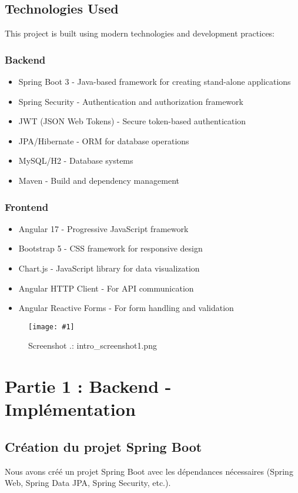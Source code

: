 \documentclass[12pt,a4paper]{report}
\newcounter{screenshotcounter}[chapter]
\newcommand{\screenshot}[2]{
  \stepcounter{screenshotcounter}
  \begin{figure}[H]
    \centering
    \texttt{[image: \#1]}
    \caption{Screenshot \thechapter.\thescreenshotcounter: #1}
    \label{fig:#1}
  \end{figure}
}
\begin{document}
\section{Technologies Used}
This project is built using modern technologies and development practices:

\subsection{Backend}
\begin{itemize}
    \item Spring Boot 3 - Java-based framework for creating stand-alone applications
    \item Spring Security - Authentication and authorization framework
    \item JWT (JSON Web Tokens) - Secure token-based authentication
    \item JPA/Hibernate - ORM for database operations
    \item MySQL/H2 - Database systems
    \item Maven - Build and dependency management
\end{itemize}

\subsection{Frontend}
\begin{itemize}
    \item Angular 17 - Progressive JavaScript framework
    \item Bootstrap 5 - CSS framework for responsive design
    \item Chart.js - JavaScript library for data visualization
    \item Angular HTTP Client - For API communication
    \item Angular Reactive Forms - For form handling and validation
\end{itemize}

\screenshot{intro_screenshot1.png}{0.8} %

\chapter{Partie 1 : Backend - Implémentation}

\section{Création du projet Spring Boot}
Nous avons créé un projet Spring Boot avec les dépendances nécessaires (Spring Web, Spring Data JPA, Spring Security, etc.).
\end{document}
